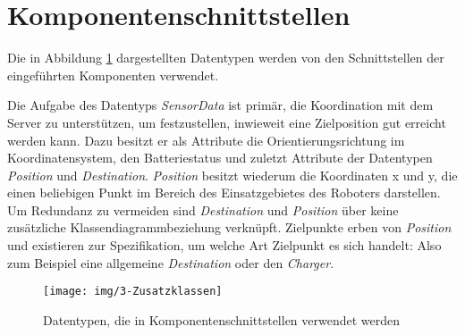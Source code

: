 \section{Komponentenschnittstellen}
Die in Abbildung \ref{KomponentenschnittstellenDiagramm} dargestellten Datentypen werden von den Schnittstellen der eingeführten Komponenten verwendet. 

Die Aufgabe des Datentyps \emph{SensorData} ist primär, die Koordination mit dem Server zu unterstützen, um festzustellen, inwieweit eine Zielposition gut erreicht werden kann. Dazu besitzt er als Attribute die Orientierungsrichtung im Koordinatensystem, den Batteriestatus und zuletzt Attribute der Datentypen \emph{Position} und \emph{Destination}. \emph{Position} besitzt wiederum die Koordinaten x und y, die einen beliebigen Punkt im Bereich des Einsatzgebietes des Roboters darstellen. Um Redundanz zu vermeiden sind \emph{Destination} und \emph{Position} über keine zusätzliche Klassendiagrammbeziehung verknüpft. Zielpunkte erben von \emph{Position} und existieren zur Spezifikation, um welche Art Zielpunkt es sich handelt: Also zum Beispiel eine allgemeine \emph{Destination} oder den \emph{Charger}.
	
	\begin{figure}[H]
		\centering
		\texttt{[image: img/3-Zusatzklassen]}
		\caption{Datentypen, die in Komponentenschnittstellen verwendet werden}
		\label{KomponentenschnittstellenDiagramm}
	\end{figure}
